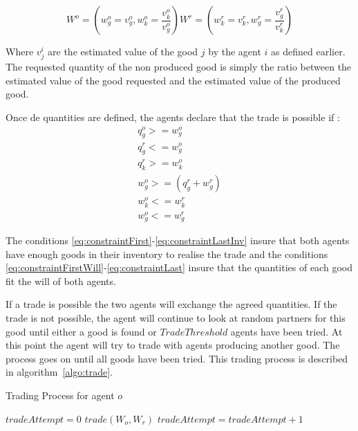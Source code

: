 \documentclass{wscpaperproc}
\begin{document}
\begin{equation}
	 W^o=(w_g^o = v_g^o,w_k^o= \frac{v_k^o}{v_g^o}) 
	 W^r=(w_k^r = v_k^r,w_g^r= \frac{v_g^r}{v_k^r}) 
	 \label{eq:trade}
\end{equation}

 Where $v_j^i$ are the estimated value of the good $j$ by the agent $i$ as defined earlier. 
The requested quantity of the non produced good is simply the ratio between the estimated value of the good requested and the estimated value of the produced good.


Once de quantities are defined, the agents declare that the trade is possible if :
\begin{align}
q_g^o >= w_g^o \label{eq:constraintFirst}\\
q_g^r <= w_g^o \\
q_k^r >= w_k^o \label{eq:constraintLastInv}\\
w_g^o>=(q_g^r+w_g^r)\label{eq:constraintFirstWill} \\
w_k^o<=w_k^r \\
w_g^o<=w_g^r
\label{eq:constraintLast}
\end{align}


The conditions \ref{eq:constraintFirst}-\ref{eq:constraintLastInv} insure that both agents have enough goods in their inventory to realise the trade and the conditions \ref{eq:constraintFirstWill}-\ref{eq:constraintLast} insure that the quantities of each good fit the will of both agents.



If a trade is possible the two agents will exchange the agreed quantities. If the trade is not possible, the agent will continue to look at random partners for this good until either a good is found or $TradeThreshold$ agents have been tried. At this point the agent will try to trade with agents producing another good. The process goes on until all goods have been tried. This trading process is described in algorithm~\ref{algo:trade}.

\begin{algorithm}
\caption{Trading Process for agent $o$}
\label{algo:trade}
	\begin{algorithmic}[1]
	\scriptsize
			\State $tradeAttempt = 0$
					\State $trade(W_o,W_r)$
				\Else
					\State $tradeAttempt = tradeAttempt + 1$					
				\EndIf
			\EndFor
		\EndFor
\end{algorithmic}
\end{algorithm}
\end{document}
